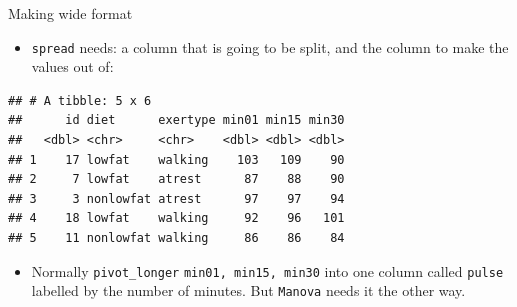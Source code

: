 \documentclass[ignorenonframetext,]{beamer}
\newenvironment{Shaded}{\begin{snugshade}}{\end{snugshade}}
\newcommand{\DataTypeTok}[1]{\textcolor[rgb]{0.13,0.29,0.53}{#1}}
\newcommand{\DecValTok}[1]{\textcolor[rgb]{0.00,0.00,0.81}{#1}}
\newcommand{\KeywordTok}[1]{\textcolor[rgb]{0.13,0.29,0.53}{\textbf{#1}}}
\newcommand{\NormalTok}[1]{#1}
\newcommand{\OperatorTok}[1]{\textcolor[rgb]{0.81,0.36,0.00}{\textbf{#1}}}
\newcommand{\StringTok}[1]{\textcolor[rgb]{0.31,0.60,0.02}{#1}}
\providecommand{\tightlist}{%
  \setlength{\itemsep}{0pt}\setlength{\parskip}{0pt}}
\begin{document}
\begin{frame}[fragile]{Making wide format}
\protect\hypertarget{making-wide-format}{}

\begin{itemize}
\tightlist
\item
  \texttt{spread} needs: a column that is going to be split, and the
  column to make the values out of:
\end{itemize}

\footnotesize

\begin{Shaded}
\end{Shaded}

\begin{verbatim}
## # A tibble: 5 x 6
##      id diet      exertype min01 min15 min30
##   <dbl> <chr>     <chr>    <dbl> <dbl> <dbl>
## 1    17 lowfat    walking    103   109    90
## 2     7 lowfat    atrest      87    88    90
## 3     3 nonlowfat atrest      97    97    94
## 4    18 lowfat    walking     92    96   101
## 5    11 nonlowfat walking     86    86    84
\end{verbatim}

\normalsize

\begin{itemize}
\tightlist
\item
  Normally \texttt{pivot\_longer} \texttt{min01, min15,
  min30} into one column called \texttt{pulse} labelled by the number of
  minutes. But \texttt{Manova} needs it the other way.
\end{itemize}

\end{frame}
\end{document}
